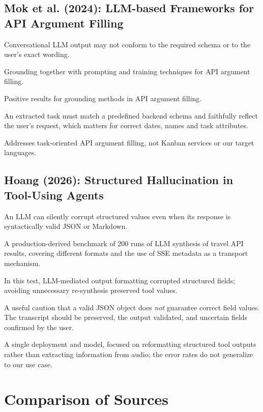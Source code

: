 \documentclass[11pt,a4paper]{article}
\newenvironment{sourceinfo}{\begin{description}[leftmargin=0pt,labelsep=0.5em,font=\normalfont\bfseries]}{\end{description}}
\newcommand{\source}[2]{\subsection{\texorpdfstring{#1~\cite{#2}}{#1}}}
\begin{document}
\source{Mok et al. (2024): LLM-based Frameworks for API Argument Filling}{mok2024llm}
\begin{sourceinfo}
  \item[Problem.] Conversational LLM output may not conform to the required schema or to the user's exact wording.
  \item[Solution.] Grounding together with prompting and training techniques for API argument filling.
  \item[Reported results.] Positive results for grounding methods in API argument filling.
  \item[Relevance.] An extracted task must match a predefined backend schema and faithfully reflect the user's request, which matters for correct dates, names and task attributes.
  \item[Limitation.] Addresses task-oriented API argument filling, not Kanban services or our target languages.
\end{sourceinfo}

\source{Hoang (2026): Structured Hallucination in Tool-Using Agents}{hoang2026structured}
\begin{sourceinfo}
  \item[Problem.] An LLM can silently corrupt structured values even when its response is syntactically valid JSON or Markdown.
  \item[Method.] A production-derived benchmark of 200 runs of LLM synthesis of travel API results, covering different formats and the use of SSE metadata as a transport mechanism.
  \item[Reported findings.] In this test, LLM-mediated output formatting corrupted structured fields; avoiding unnecessary re-synthesis preserved tool values.
  \item[Relevance.] A useful caution that a valid JSON object does \emph{not} guarantee correct field values. The transcript should be preserved, the output validated, and uncertain fields confirmed by the user.
  \item[Limitation.] A single deployment and model, focused on reformatting structured tool outputs rather than extracting information from audio; the error rates do not generalize to our use case.
\end{sourceinfo}

\section{Comparison of Sources}
\end{document}
